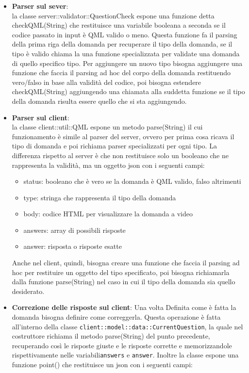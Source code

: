 \documentclass[12pt,a4paper]{article}
\begin{document}
	\begin{itemize}
	\item \textbf{Parser sul sever}:\\
	la classe server::validator::QuestionCheck espone una funzione detta checkQML(String) che restituisce una variabile booleana a seconda se il codice passato in input è QML valido o meno.
	Questa funzione fa il parsing della prima riga della domanda per recuperare il tipo della domanda, se il tipo è valido chiama la una funzione specializzata per validate una domanda di quello specifico tipo. Per aggiungere un nuovo tipo bisogna aggiungere una funzione che faccia il parsing ad hoc del corpo della domanda restituendo vero/falso in base alla validità del codice, poi bisogna estendere checkQML(String) aggiungendo una chiamata alla suddetta funzione se il tipo della domanda risulta essere quello che si sta aggiungendo.
	\item \textbf{Parser sul client}:\\
	la classe client::util::QML espone un metodo parse(String) il cui funzionamento è simile al parser del server, ovvero per prima cosa ricava il tipo di domanda e poi richiama parser specializzati per ogni tipo. La differenza rispetto al server è che non restituisce solo un booleano che ne rappresenta la validità, ma un oggetto json con i seguenti campi:
	\begin{itemize}
	\item status: booleano che è vero se la domanda è QML valido, falso altrimenti
	\item type: stringa che rappresenta il tipo della domanda
	\item body: codice HTML per visualizzare la domanda a video
	\item answers: array di possibili risposte
	\item answer: risposta o risposte esatte
	\end{itemize}
	Anche nel client, quindi, bisogna creare una funzione che faccia il parsing ad hoc per restituire un oggetto del tipo specificato, poi bisogna richiamarla dalla funzione parse(String) nel caso in cui il tipo della domanda sia quello desiderato.
	\item \textbf{Correzione delle risposte sul client}:
	Una volta Definita come è fatta la domanda bisogna definire come correggerla. Questa operazione è fatta all’interno della classe \texttt{client::model::data::CurrentQuestion}, la quale nel costruttore richiama il metodo parse(String) del punto precedente, recuperando così le risposte giuste e le risposte corrette e memorizzandole rispettivamente nelle variabili\texttt{answers} e \texttt{answer}. Inoltre la classe espone una funzione point() che restituisce un json con i seguenti campi:

\end{itemize}
\end{document}
